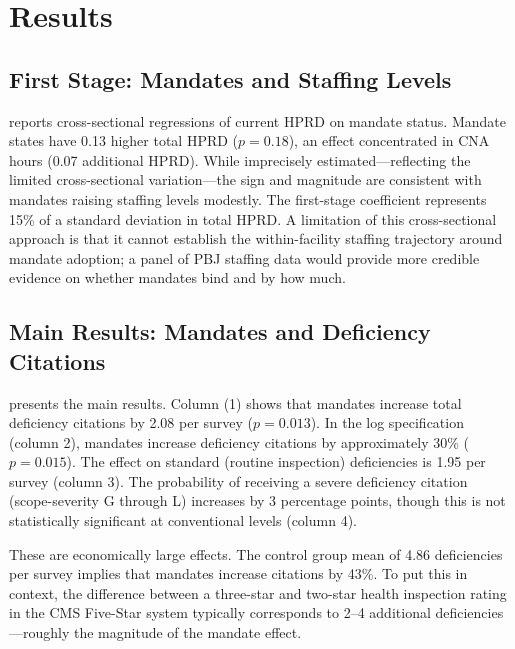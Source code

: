 \documentclass[12pt]{article}
\begin{document}
\section{Results}

\subsection{First Stage: Mandates and Staffing Levels}



 reports cross-sectional regressions of current HPRD on mandate status. Mandate states have 0.13 higher total HPRD ($p = 0.18$), an effect concentrated in CNA hours (0.07 additional HPRD). While imprecisely estimated---reflecting the limited cross-sectional variation---the sign and magnitude are consistent with mandates raising staffing levels modestly. The first-stage coefficient represents 15\% of a standard deviation in total HPRD. A limitation of this cross-sectional approach is that it cannot establish the within-facility staffing trajectory around mandate adoption; a panel of PBJ staffing data would provide more credible evidence on whether mandates bind and by how much.

\subsection{Main Results: Mandates and Deficiency Citations}



 presents the main results. Column (1) shows that mandates increase total deficiency citations by 2.08 per survey ($p = 0.013$). In the log specification (column 2), mandates increase deficiency citations by approximately 30\% ($p = 0.015$). The effect on standard (routine inspection) deficiencies is 1.95 per survey (column 3). The probability of receiving a severe deficiency citation (scope-severity G through L) increases by 3 percentage points, though this is not statistically significant at conventional levels (column 4).

These are economically large effects. The control group mean of 4.86 deficiencies per survey implies that mandates increase citations by 43\%. To put this in context, the difference between a three-star and two-star health inspection rating in the CMS Five-Star system typically corresponds to 2--4 additional deficiencies---roughly the magnitude of the mandate effect.
\end{document}
